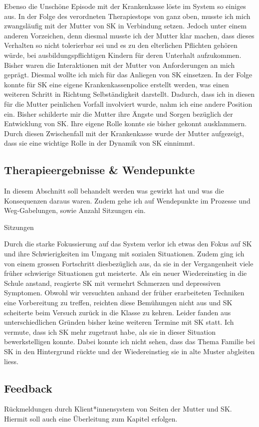 Ebenso die Unschöne Episode mit der Krankenkasse löste im System so einiges aus. In der Folge des verordneten Therapiestops von ganz oben, musste ich mich zwangsläufig mit der Mutter von SK in Verbindung setzen. Jedoch unter einem anderen Vorzeichen, denn diesmal musste ich der Mutter klar machen, dass dieses Verhalten so nicht tolerierbar sei und es zu den elterlichen Pflichten gehören würde, bei ausbildungspflichtigen Kindern für deren Unterhalt aufzukommen. Bisher waren die Interaktionen mit der Mutter von Anforderungen an mich geprägt. Diesmal wollte ich mich für das Anliegen von SK einsetzen. In der Folge konnte für SK eine eigene Krankenkassenpolice erstellt werden, was einen weiteren Schritt in Richtung Selbständigkeit darstellt. Dadurch, dass ich in diesen für die Mutter peinlichen Vorfall involviert wurde, nahm ich eine andere Position ein. Bisher schilderte mir die Mutter ihre Ängste und Sorgen bezüglich der Entwicklung von SK. Ihre eigene Rolle konnte sie bisher gekonnt ausklammern. Durch diesen Zwischenfall mit der Krankenkasse wurde der Mutter aufgezeigt, dass sie eine wichtige Rolle in der Dynamik von SK einnimmt. 
 

\subsection{Therapieergebnisse \& Wendepunkte} \label{sc:therapieergebnisse}
In diesem Abschnitt soll behandelt werden was gewirkt hat und was die Konsequenzen daraus waren. Zudem gehe ich auf Wendepunkte im Prozesse und Weg-Gabelungen, sowie Anzahl Sitzungen ein. 

Sitzungen

Durch die starke Fokussierung auf das System verlor ich etwas den Fokus auf SK und ihre Schwierigkeiten im Umgang mit sozialen Situationen. Zudem ging ich von einem grossen Fortschritt diesbezüglich aus, da sie in der Vergangenheit viele früher schwierige Situationen gut meisterte. Als ein neuer Wiedereinstieg in die Schule anstand, reagierte SK mit vermehrt Schmerzen und depressiven Symptomen. Obwohl wir versuchten anhand der früher erarbeiteten Techniken eine Vorbereitung zu treffen, reichten diese Bemühungen nicht aus und SK scheiterte beim Versuch zurück in die Klasse zu kehren. Leider fanden aus unterschiedlichen Gründen bisher keine weiteren Termine mit SK statt. Ich vermute, dass ich SK mehr zugetraut habe, als sie in dieser Situation bewerkstelligen konnte. Dabei konnte ich nicht sehen, dass das Thema Familie bei SK in den Hintergrund rückte und der Wiedereinstieg sie in alte Muster abgleiten liess. 


\subsection{Feedback} Rückmeldungen durch Klient*innensystem von Seiten der Mutter und SK. Hiermit soll auch eine Überleitung zum Kapitel  erfolgen.